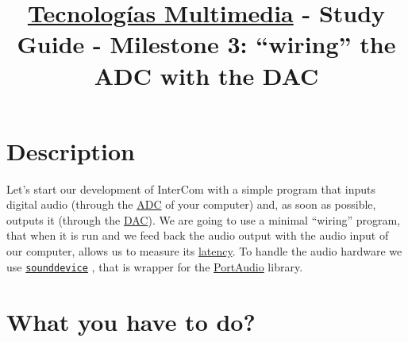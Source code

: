 \title{\href{https://www.ual.es/estudios/grados/presentacion/plandeestudios/asignatura/4015/40154321?idioma=zh_CN}{Tecnologías Multimedia} - Study Guide - Milestone 3: ``wiring'' the ADC with the DAC}

\maketitle

\section{Description}

Let's start our development of InterCom with a simple program that
inputs digital audio (through the
\href{https://en.wikipedia.org/wiki/Analog-to-digital_converter}{ADC}
of your computer) and, as soon as possible, outputs it (through the
\href{https://en.wikipedia.org/wiki/Digital-to-analog_converter}{DAC}). We
are going to use a minimal ``wiring'' program, that when it is run and
we feed back the audio output with the audio input of our computer,
allows us to measure
its \href{https://en.wikipedia.org/wiki/Latency_(engineering)}{latency}. To
handle the audio hardware we use
\href{https://python-sounddevice.readthedocs.io}{\texttt{sounddevice}}
\cite{sounddevice}, that is wrapper for the
\href{http://www.portaudio.com/}{PortAudio} library.

\section{What you have to do?}

